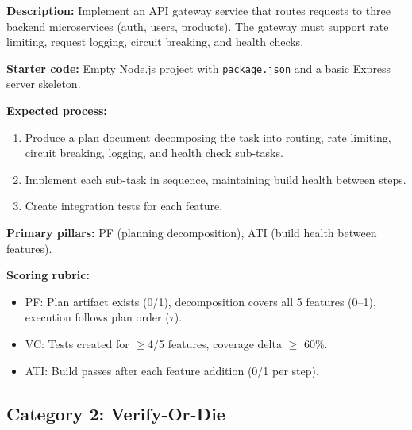 \documentclass[letterpaper, 10 pt, conference]{ieeeconf}
\begin{document}
\begin{tcolorbox}[colback=lightgray, colframe=pillarblue, title={Task PTB-1: Multi-Service API Gateway}]
\textbf{Description:} Implement an API gateway service that routes requests to three backend microservices (auth, users, products). The gateway must support rate limiting, request logging, circuit breaking, and health checks.

\textbf{Starter code:} Empty Node.js project with \texttt{package.json} and a basic Express server skeleton.

\textbf{Expected process:}
\begin{enumerate}[itemsep=1pt]
  \item Produce a plan document decomposing the task into routing, rate limiting, circuit breaking, logging, and health check sub-tasks.
  \item Implement each sub-task in sequence, maintaining build health between steps.
  \item Create integration tests for each feature.
\end{enumerate}

\textbf{Primary pillars:} PF (planning decomposition), ATI (build health between features).

\textbf{Scoring rubric:}
\begin{itemize}[itemsep=1pt]
  \item PF: Plan artifact exists (0/1), decomposition covers all 5 features (0--1), execution follows plan order ($\tau$).
  \item VC: Tests created for $\geq$4/5 features, coverage delta $\geq$ 60\%.
  \item ATI: Build passes after each feature addition (0/1 per step).
\end{itemize}
\end{tcolorbox}

\subsection{Category 2: Verify-Or-Die}
\end{document}
